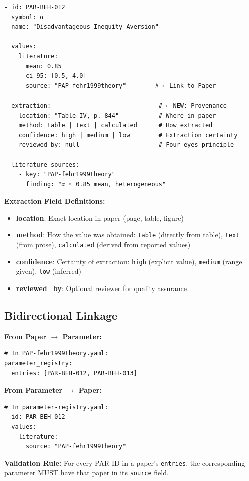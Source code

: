 \begin{tcolorbox}[colback=orange!5!white, colframe=orange!75!black,
    title=Parameter-Registry: extraction Schema]

\begin{verbatim}
- id: PAR-BEH-012
  symbol: α
  name: "Disadvantageous Inequity Aversion"

  values:
    literature:
      mean: 0.85
      ci_95: [0.5, 4.0]
      source: "PAP-fehr1999theory"        # ← Link to Paper

  extraction:                              # ← NEW: Provenance
    location: "Table IV, p. 844"           # Where in paper
    method: table | text | calculated      # How extracted
    confidence: high | medium | low        # Extraction certainty
    reviewed_by: null                      # Four-eyes principle

  literature_sources:
    - key: "PAP-fehr1999theory"
      finding: "α ≈ 0.85 mean, heterogeneous"
\end{verbatim}

\textbf{Extraction Field Definitions:}
\begin{itemize}[nosep]
    \item \textbf{location}: Exact location in paper (page, table, figure)
    \item \textbf{method}: How the value was obtained:
          \texttt{table} (directly from table),
          \texttt{text} (from prose),
          \texttt{calculated} (derived from reported values)
    \item \textbf{confidence}: Certainty of extraction:
          \texttt{high} (explicit value),
          \texttt{medium} (range given),
          \texttt{low} (inferred)
    \item \textbf{reviewed\_by}: Optional reviewer for quality assurance
\end{itemize}

\end{tcolorbox}

\subsection{Bidirectional Linkage}

\begin{tcolorbox}[colback=purple!5!white, colframe=purple!75!black,
    title=Bidirectional Verification]

\textbf{From Paper $\rightarrow$ Parameter:}
\begin{verbatim}
# In PAP-fehr1999theory.yaml:
parameter_registry:
  entries: [PAR-BEH-012, PAR-BEH-013]
\end{verbatim}

\textbf{From Parameter $\rightarrow$ Paper:}
\begin{verbatim}
# In parameter-registry.yaml:
- id: PAR-BEH-012
  values:
    literature:
      source: "PAP-fehr1999theory"
\end{verbatim}

\textbf{Validation Rule:} For every PAR-ID in a paper's \texttt{entries},
the corresponding parameter MUST have that paper in its \texttt{source} field.

\end{tcolorbox}

